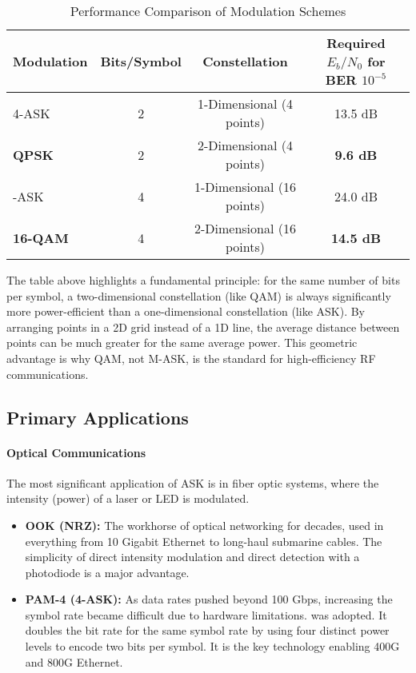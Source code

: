 \begin{table}[H]
    \centering
    \caption{Performance Comparison of Modulation Schemes}
    \label{tab:ask-comparison}
    \begin{tabular}{@{}lccc@{}}
        \toprule
        \tableheaderfont Modulation & \tableheaderfont Bits/Symbol & \tableheaderfont Constellation & \tableheaderfont Required $E_b/N_0$ for BER $10^{-5}$ \\
        \midrule
        4-ASK & 2 & 1-Dimensional (4 points) & 13.5 dB \\
        \textbf{QPSK} & 2 & 2-Dimensional (4 points) & \textbf{9.6 dB} \\
        \addlinespace
        16-ASK & 4 & 1-Dimensional (16 points) & 24.0 dB \\
        \textbf{16-QAM} & 4 & 2-Dimensional (16 points) & \textbf{14.5 dB} \\
        \bottomrule
    \end{tabular}
\end{table}

\begin{importantbox}[title={Why QAM is Superior to M-ASK}]
    The table above highlights a fundamental principle: for the same number of bits per symbol, a two-dimensional constellation (like QAM) is always significantly more power-efficient than a one-dimensional constellation (like ASK). By arranging points in a 2D grid instead of a 1D line, the average distance between points can be much greater for the same average power. This geometric advantage is why QAM, not M-ASK, is the standard for high-efficiency RF communications.
\end{importantbox}


\subsection{Primary Applications}

\paragraph{Optical Communications}
The most significant application of ASK is in fiber optic systems, where the intensity (power) of a laser or LED is modulated.
\begin{itemize}
    \item \textbf{OOK (NRZ):} The workhorse of optical networking for decades, used in everything from 10 Gigabit Ethernet to long-haul submarine cables. The simplicity of direct intensity modulation and direct detection with a photodiode is a major advantage.
    \item \textbf{PAM-4 (4-ASK):} As data rates pushed beyond 100 Gbps, increasing the symbol rate became difficult due to hardware limitations.  was adopted. It doubles the bit rate for the same symbol rate by using four distinct power levels to encode two bits per symbol. It is the key technology enabling 400G and 800G Ethernet.
\end{itemize}

